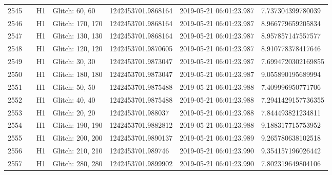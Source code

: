 \begin{longtable}{lllllll}
2545 &                                                    &       H1 &    Glitch: 60, 60 &  1242453701.9868164 &  2019-05-21 06:01:23.987 &   7.737304399780039 \\
2546 &                                                    &       H1 &  Glitch: 170, 170 &  1242453701.9868164 &  2019-05-21 06:01:23.987 &   8.966779659205834 \\
2547 &                                                    &       H1 &  Glitch: 130, 130 &  1242453701.9868164 &  2019-05-21 06:01:23.987 &   8.957857147557577 \\
2548 &                                                    &       H1 &  Glitch: 120, 120 &  1242453701.9870605 &  2019-05-21 06:01:23.987 &   8.910778378417646 \\
2549 &                                                    &       H1 &    Glitch: 30, 30 &  1242453701.9873047 &  2019-05-21 06:01:23.987 &  7.6994720302169855 \\
2550 &                                                    &       H1 &  Glitch: 180, 180 &  1242453701.9873047 &  2019-05-21 06:01:23.987 &   9.055890195689994 \\
2551 &                                                    &       H1 &    Glitch: 50, 50 &  1242453701.9875488 &  2019-05-21 06:01:23.988 &   7.409996950771706 \\
2552 &                                                    &       H1 &    Glitch: 40, 40 &  1242453701.9875488 &  2019-05-21 06:01:23.988 &  7.2941429157736355 \\
2553 &                                                    &       H1 &    Glitch: 20, 20 &   1242453701.988037 &  2019-05-21 06:01:23.988 &   7.844493821234811 \\
2554 &                                                    &       H1 &  Glitch: 190, 190 &  1242453701.9882812 &  2019-05-21 06:01:23.988 &   9.188317715753952 \\
2555 &                                                    &       H1 &  Glitch: 200, 200 &  1242453701.9890137 &  2019-05-21 06:01:23.989 &   9.265780638102518 \\
2556 &                                                    &       H1 &  Glitch: 210, 210 &   1242453701.989746 &  2019-05-21 06:01:23.990 &   9.354157196026442 \\
2557 &                                                    &       H1 &  Glitch: 280, 280 &  1242453701.9899902 &  2019-05-21 06:01:23.990 &   7.802319649804106 \\

\end{longtable}
